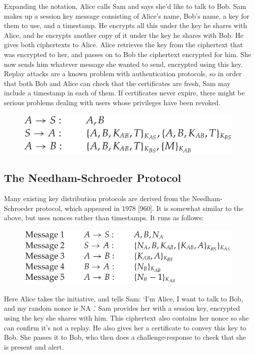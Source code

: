 		Expanding the notation, Alice calls Sam and says she’d like to talk to
		Bob. Sam makes up a session key message consisting of Alice’s name, Bob’s
		name, a key for them to use, and a timestamp. He encrypts all this under
		the key he shares with Alice, and he encrypts another copy of it under the
		key he shares with Bob. He gives both ciphertexts to Alice. Alice retrieves
		the key from the ciphertext that was encrypted to her, and passes on to
		Bob the ciphertext encrypted for him. She now sends him whatever message
		she wanted to send, encrypted using this key.
		Replay attacks are a known problem with authentication protocols, so in
		order that both Bob and Alice can check that the certificates are fresh, Sam may
		include a timestamp in each of them. If certificates never expire, there might
		be serious problems dealing with users whose privileges have been revoked.

		\begin{figure}[H]
			\centering
			\includegraphics[scale=0.5]{pics/basicKeyManagement.png}
		\end{figure}

	\subsection{The Needham-Schroeder Protocol}
		Many existing key distribution protocols are derived from the Needham-Schroeder
		protocol, which appeared in 1978 [960]. It is somewhat similar to the above,
		but uses nonces rather than timestamps. It runs as follows:

		\begin{figure}[H]
			\centering
			\includegraphics[scale=0.4]{pics/NeedhamSchroederProtocol.png}
		\end{figure}

		Here Alice takes the initiative, and tells Sam: ‘I’m Alice, I want to talk to Bob,
		and my random nonce is NA .’ Sam provides her with a session key, encrypted
		using the key she shares with him. This ciphertext also contains her nonce so
		she can confirm it’s not a replay. He also gives her a certificate to convey this
		key to Bob. She passes it to Bob, who then does a challenge-response to check
		that she is present and alert.

